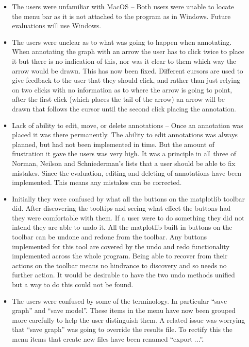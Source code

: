 \begin{itemize}
\item The users were unfamiliar with MacOS -- Both users were unable to locate the menu bar as it is not attached to the program as in Windows.  Future evaluations will use Windows.
\item The users were unclear as to what was going to happen when annotating.  When annotating the graph with an arrow the user has to click twice to place it but there is no indication of this, nor was it clear to them which way the arrow would be drawn.  This has now been fixed. Different cursors are used to give feedback to the user that they should click, and rather than just relying on two clicks with no information as to where the arrow is going to point, after the first click (which places the tail of the arrow) an arrow will be drawn that follows the cursor until the second click placing the annotation.
\item Lack of ability to edit, move, or delete annotations -- Once an annotation was placed it was there permanently.  The ability to edit annotations was always planned, but had not been implemented in time.  But the amount of frustration it gave the users was very high.  It was a principle in all three of Norman, Neilson and Schniederman's lists that a user should be able to fix mistakes.  Since the evaluation, editing and deleting of annotations have been implemented.  This means any mistakes can be corrected.
\item Initially they were confused by what all the buttons on the matplotlib toolbar did.  After discovering the tooltips and seeing what effect the buttons had they were comfortable with them.  If a user were to do something they did not intend they are able to undo it. All the matplotlib built-in buttons on the toolbar can be undone and redone from the toolbar.  Any buttons implemented for this tool are covered by the undo and redo functionality implemented across the whole program.  Being able to recover from their actions on the toolbar means no hindrance to discovery and so needs no further action.  It would be desirable to have the two undo methods unified but a way to do this could not be found.
\item The users were confused by some of the terminology.  In particular ``save graph'' and ``save model''. These items in the menu have now been grouped more carefully to help the user distinguish them.  A related issue was worrying that ``save graph'' was going to override the results file.  To rectify this the menu items that create new files have been renamed ``export ...''.

\end{itemize}
